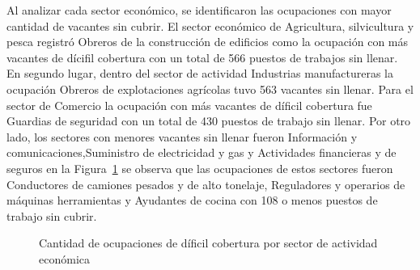 \documentclass[
  11pt,
]{article}
\begin{document}
Al analizar cada sector económico, se identificaron las ocupaciones con
mayor cantidad de vacantes sin cubrir. El sector económico de
Agricultura, silvicultura y pesca registró Obreros de la construcción de
edificios como la ocupación con más vacantes de dícifil cobertura con un
total de 566 puestos de trabajos sin llenar. En segundo lugar, dentro
del sector de actividad Industrias manufactureras la ocupación Obreros
de explotaciones agrícolas tuvo 563 vacantes sin llenar. Para el sector
de Comercio la ocupación con más vacantes de díficil cobertura fue
Guardias de seguridad con un total de 430 puestos de trabajo sin llenar.
Por otro lado, los sectores con menores vacantes sin llenar fueron
Información y comunicaciones,Suministro de electricidad y gas y
Actividades financieras y de seguros en la Figura~\ref{fig-odc_sector}
se observa que las ocupaciones de estos sectores fueron Conductores de
camiones pesados y de alto tonelaje, Reguladores y operarios de máquinas
herramientas y Ayudantes de cocina con 108 o menos puestos de trabajo
sin cubrir.

\begin{figure}[H]

\caption{\label{fig-odc_sector}Cantidad de ocupaciones de díficil
cobertura por sector de actividad económica}


\end{figure}%
\end{document}
